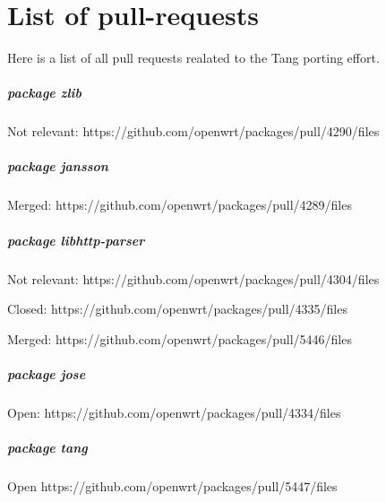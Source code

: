 \chapter{List of pull-requests}\label{diffs}
Here is a list of all pull requests realated to the Tang porting effort.

\paragraph{package zlib}

Not relevant:
https://github.com/openwrt/packages/pull/4290/files

\paragraph{package jansson}

Merged:
https://github.com/openwrt/packages/pull/4289/files

\paragraph{package libhttp-parser}

Not relevant:
https://github.com/openwrt/packages/pull/4304/files

Closed:
https://github.com/openwrt/packages/pull/4335/files

Merged:
https://github.com/openwrt/packages/pull/5446/files


\paragraph{package jose}

Open:
https://github.com/openwrt/packages/pull/4334/files

\paragraph{package tang}

Open
https://github.com/openwrt/packages/pull/5447/files
